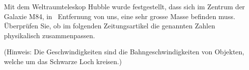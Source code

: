 Mit dem Weltraumteleskop Hubble wurde festgestellt, dass sich im Zentrum der Galaxie M84, in \dMeO\ Entfernung von uns, eine sehr grosse Masse befinden muss. Überprüfen Sie, ob im folgenden Zeitungsartikel die genannten Zahlen physikalisch zusammenpassen.

(Hinweis: Die Geschwindigkeiten sind die Bahngeschwindigkeiten von Objekten, welche um das Schwarze Loch kreisen.)

\begin{center}
\end{center}
